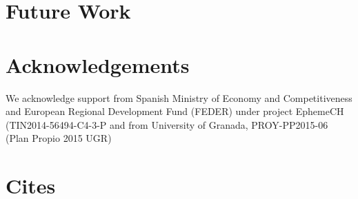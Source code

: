 \documentclass[runningheads,a4paper]{llncs}
\begin{document}
\section{Future Work}
\label{future-work}

\section{Acknowledgements}

We acknowledge support from 
Spanish Ministry of Economy and Competitiveness and European Regional
Development Fund (FEDER) under project EphemeCH
(TIN2014-56494-C4-3-P and  
from University of Granada, PROY-PP2015-06 (Plan Propio 2015 UGR)
\section{Cites}


\cite{garcia2015evospace}
\cite{garcia2014randomized}
\cite{merelo2012pool}
\cite{mussi2011gpu}
\cite{merelo2013designing}
\cite{merelo2008asynchronous}
\cite{morrison2001measurement}
\cite{roy2009distributed}
\cite{sherry2012flex}
\cite{tanabe2013evaluation}
\cite{de1990analysis}
\cite{melin2013optimal}
\cite{zadeh1988fuzzy}
\cite{zadeh1965fuzzy}
\cite{abdelbar2005fuzzy}
\cite{kenndy1995particle}
\cite{mcnabb2007parallel}
\cite{venter2006parallel}
\cite{koh2006parallel}
\cite{cheng2013population}
\cite{gong2011distributed}



\end{document}
